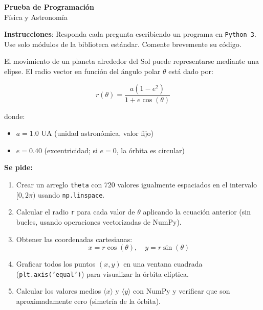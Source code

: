 \documentclass[10pt]{article}
\begin{document}
\begin{center}
  {\huge\bfseries\textcolor{unabblue}{Prueba de Programación}}\\[4pt]
  {\Large\sffamily\textcolor{unabgold}{Física y Astronomía}}\\[6pt]
\end{center}

\vspace{0.5em}
\noindent\textbf{Instrucciones}: Responda cada pregunta escribiendo un programa en \texttt{Python 3}. Use solo módulos de la biblioteca estándar. Comente brevemente su código.



\noindent\makebox[\linewidth]{\rule{\textwidth}{0.4pt}}


\begin{tcolorbox}[title={Pregunta 1 – Órbita elíptica parametrizada}]

El movimiento de un planeta alrededor del Sol puede representarse mediante una elipse.  
El radio vector en función del ángulo polar $\theta$ está dado por:

\[
r(\theta) = \frac{a (1 - e^2)}{1 + e \cos(\theta)}
\]

donde:
\begin{itemize}
    \item $a = 1.0$ UA (unidad astronómica, valor fijo)
    \item $e = 0.40$ (excentricidad; si $e=0$, la órbita es circular)
\end{itemize}

\vspace{2mm}
\textbf{Se pide:}
\begin{enumerate}
    \item Crear un arreglo \texttt{theta} con 720 valores igualmente espaciados en el intervalo $[0, 2\pi)$ usando \texttt{np.linspace}.
    
    \item Calcular el radio \texttt{r} para cada valor de $\theta$ aplicando la ecuación anterior (sin bucles, usando operaciones vectorizadas de NumPy).
    
    \item Obtener las coordenadas cartesianas:
    \[
    x = r \cos(\theta), \quad y = r \sin(\theta)
    \]
    
    \item Graficar todos los puntos $(x, y)$ en una ventana cuadrada (\texttt{plt.axis('equal')}) para visualizar la órbita elíptica.
    
    \item Calcular los valores medios $\langle x \rangle$ y $\langle y \rangle$ con NumPy y verificar que son aproximadamente cero (simetría de la órbita).
\end{enumerate}

\end{tcolorbox}
\end{document}
